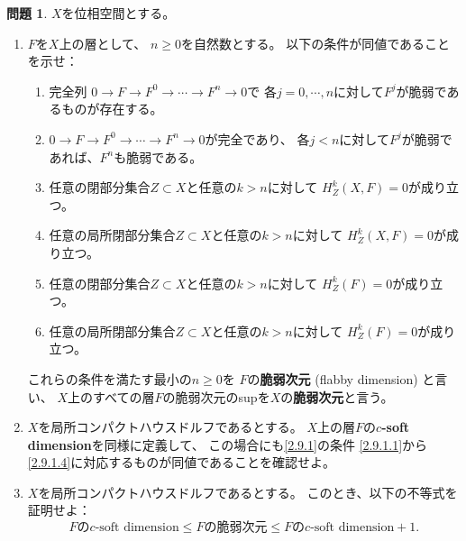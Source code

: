 \documentclass[uplatex,dvipdfmx]{jsarticle}
\theoremstyle{definition}
\newtheorem{prob}[prob]{問題}
\begin{document}
\begin{prob}\label{2.9}
  \(X\)を位相空間とする。
  \begin{enumerate}
    \item \label{2.9.1}
    \(F\)を\(X\)上の層として、
    \(n \geq 0\)を自然数とする。
    以下の条件が同値であることを示せ：
    \begin{enumerate}
      \item \label{2.9.1.1}
      完全列
      \(0\to F\to F^0\to \cdots \to F^n\to 0\)で
      各\(j=0,\cdots,n\)に対して\(F^j\)が脆弱であるものが存在する。
      \item \label{2.9.1.2}
      \(0\to F\to F^0\to \cdots \to F^n\to 0\)が完全であり、
      各\(j<n\)に対して\(F^j\)が脆弱であれば、\(F^n\)も脆弱である。
      \item \label{2.9.1.3}
      任意の閉部分集合\(Z\subset X\)と任意の\(k>n\)に対して
      \(H^k_Z(X,F) = 0\)が成り立つ。
      \item \label{2.9.1.4}
      任意の局所閉部分集合\(Z\subset X\)と任意の\(k>n\)に対して
      \(H^k_Z(X,F) = 0\)が成り立つ。
      \item \label{2.9.1.5}
      任意の閉部分集合\(Z\subset X\)と任意の\(k>n\)に対して
      \(H^k_Z(F) = 0\)が成り立つ。
      \item \label{2.9.1.6}
      任意の局所閉部分集合\(Z\subset X\)と任意の\(k>n\)に対して
      \(H^k_Z(F) = 0\)が成り立つ。
    \end{enumerate}
    これらの条件を満たす最小の\(n\geq 0\)を
    \(F\)の\textbf{脆弱次元} (flabby dimension) と言い、
    \(X\)上のすべての層\(F\)の脆弱次元のsupを\(X\)の\textbf{脆弱次元}と言う。
    \item \label{2.9.2}
    \(X\)を局所コンパクトハウスドルフであるとする。
    \(X\)上の層\(F\)の\textbf{\(c\)-soft dimension}を同様に定義して、
    この場合にも\ref{2.9.1}の条件
    \ref{2.9.1.1}から\ref{2.9.1.4}に対応するものが同値であることを確認せよ。
    \item \label{2.9.3}
    \(X\)を局所コンパクトハウスドルフであるとする。
    このとき、以下の不等式を証明せよ：
    \[
    \text{\(F\)の\(c\)-soft dimension} \leq \text{\(F\)の脆弱次元}
    \leq \text{\(F\)の\(c\)-soft dimension} + 1.
    \]
  \end{enumerate}
\end{prob}
\end{document}
